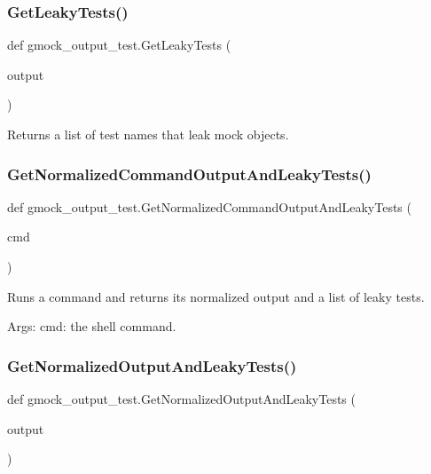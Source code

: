 \subsubsection{\texorpdfstring{GetLeakyTests()}{GetLeakyTests()}}
{\footnotesize\ttfamily def gmock\+\_\+output\+\_\+test.\+Get\+Leaky\+Tests (\begin{DoxyParamCaption}\item[{}]{output }\end{DoxyParamCaption})}

\begin{DoxyVerb}Returns a list of test names that leak mock objects.\end{DoxyVerb}
 \mbox{\label{namespacegmock__output__test_a1796bc395fbfb8873992e3f84378e4bf}} 
\subsubsection{\texorpdfstring{GetNormalizedCommandOutputAndLeakyTests()}{GetNormalizedCommandOutputAndLeakyTests()}}
{\footnotesize\ttfamily def gmock\+\_\+output\+\_\+test.\+Get\+Normalized\+Command\+Output\+And\+Leaky\+Tests (\begin{DoxyParamCaption}\item[{}]{cmd }\end{DoxyParamCaption})}

\begin{DoxyVerb}Runs a command and returns its normalized output and a list of leaky tests.

Args:
  cmd:  the shell command.
\end{DoxyVerb}
 \mbox{\label{namespacegmock__output__test_a590ba3b918e5599eeabc2cbf597e2ce1}} 
\subsubsection{\texorpdfstring{GetNormalizedOutputAndLeakyTests()}{GetNormalizedOutputAndLeakyTests()}}
{\footnotesize\ttfamily def gmock\+\_\+output\+\_\+test.\+Get\+Normalized\+Output\+And\+Leaky\+Tests (\begin{DoxyParamCaption}\item[{}]{output }\end{DoxyParamCaption})}

